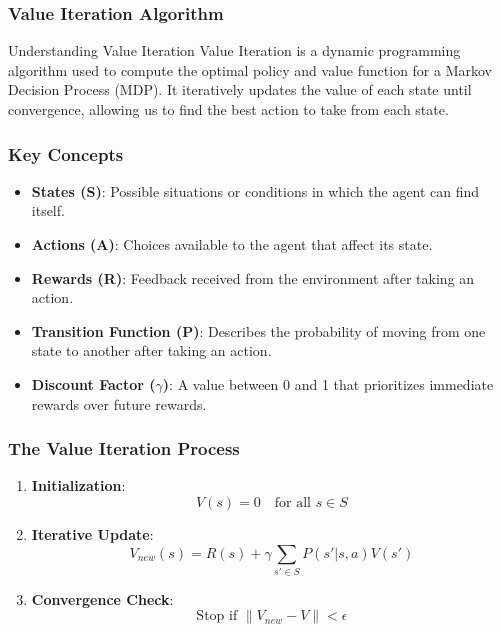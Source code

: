 \documentclass[aspectratio=169]{beamer}
\begin{document}
\begin{frame}[fragile]
    \frametitle{Value Iteration Algorithm}
    
    \begin{block}{Understanding Value Iteration}
        Value Iteration is a dynamic programming algorithm used to compute the optimal policy and value function for a Markov Decision Process (MDP). It iteratively updates the value of each state until convergence, allowing us to find the best action to take from each state.
    \end{block}
\end{frame}

\begin{frame}[fragile]
    \frametitle{Key Concepts}
    
    \begin{itemize}
        \item \textbf{States (S)}: Possible situations or conditions in which the agent can find itself.
        \item \textbf{Actions (A)}: Choices available to the agent that affect its state.
        \item \textbf{Rewards (R)}: Feedback received from the environment after taking an action.
        \item \textbf{Transition Function (P)}: Describes the probability of moving from one state to another after taking an action.
        \item \textbf{Discount Factor ($\gamma$)}: A value between 0 and 1 that prioritizes immediate rewards over future rewards.
    \end{itemize}
\end{frame}

\begin{frame}[fragile]
    \frametitle{The Value Iteration Process}

    \begin{enumerate}
        \item \textbf{Initialization}:
        \[
        V(s) = 0 \quad \text{for all } s \in S
        \]

        \item \textbf{Iterative Update}:
        \[
        V_{new}(s) = R(s) + \gamma \sum_{s' \in S} P(s' | s, a) V(s')
        \]

        \item \textbf{Convergence Check}:
        \[
        \text{Stop if } \| V_{new} - V \| < \epsilon
        \]
    \end{enumerate}
\end{frame}
\end{document}
